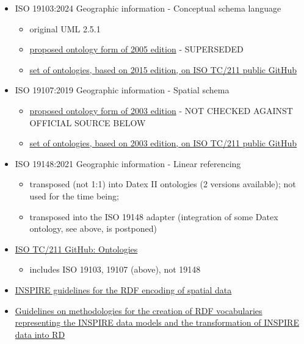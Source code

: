 \documentclass[
  11pt,
]{article}
\providecommand{\tightlist}{%
  \setlength{\itemsep}{0pt}\setlength{\parskip}{0pt}}
\begin{document}
\begin{itemize}
\tightlist
\item
  ISO 19103:2024 Geographic information - Conceptual schema language

  \begin{itemize}
  \tightlist
  \item
    original UML 2.5.1
  \item
    \href{https://lov.linkeddata.es/dataset/lov/vocabs/basic}{proposed
    ontology form of 2005 edition} - SUPERSEDED
  \item
    \href{https://github.com/ISO-TC211/ontologies/tree/main/iso19103/2015}{set
    of ontologies, based on 2015 edition, on ISO TC/211 public GitHub}
  \end{itemize}
\item
  ISO 19107:2019 Geographic information - Spatial schema

  \begin{itemize}
  \tightlist
  \item
    \href{https://lov.linkeddata.es/dataset/lov/vocabs/gm}{proposed
    ontology form of 2003 edition} - NOT CHECKED AGAINST OFFICIAL SOURCE
    BELOW
  \item
    \href{https://github.com/ISO-TC211/ontologies/tree/main/iso19107/2003}{set
    of ontologies, based on 2003 edition, on ISO TC/211 public GitHub}
  \end{itemize}
\item
  ISO 19148:2021 Geographic information - Linear referencing

  \begin{itemize}
  \tightlist
  \item
    transposed (not 1:1) into Datex II ontologies (2 versions
    available); not used for the time being;
  \item
    transposed into the ISO 19148 adapter (integration of some Datex
    ontology, see above, is postponed)
  \end{itemize}
\item
  \href{https://github.com/ISO-TC211/ontologies}{ISO TC/211 GitHub:
  Ontologies}

  \begin{itemize}
  \tightlist
  \item
    includes ISO 19103, 19107 (above), not 19148
  \end{itemize}
\item
  \href{https://inspire-eu-rdf.github.io/inspire-rdf-guidelines/}{INSPIRE
  guidelines for the RDF encoding of spatial data}
\item
  \href{https://interoperable-europe.ec.europa.eu/sites/default/files/document/2016-02/are3na-rdf_vocabulary_guidelines_final.pdf}{Guidelines
  on methodologies for the creation of RDF vocabularies representing the
  INSPIRE data models and the transformation of INSPIRE data into RD}
\end{itemize}
\end{document}
